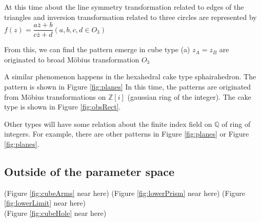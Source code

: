\documentclass[suppldata, dvipdfmx]{interact}
\theoremstyle{plain}%
\theoremstyle{definition}
\theoremstyle{remark}
\theoremstyle{problemstyle}
\begin{document}
At this time about the line symmetry transformation related to edges of
the triangles and inversion transformation related to three circles 
are represented by
$f(z) = \dfrac{a\overline{z} + b}{c\overline{z}+ d} (a, b, c, d \in O_3)$

From this, we can find the pattern emerge in cube type (a) $z_A = z_B$
are originated to broad M\"obius transformation $O_3$

A similar phenomenon happens in the hexahedral cake type sphairahedron.
The pattern is shown in Figure \ref{fig:planes}
In this time, the patterns are originated from M\"obius transformations
on $\mathbb{Z}[i]$ (gaussian ring of the integer).
The cake type is shown in Figure \ref{fig:obsRect}.

Other types will have some relation about the finite index field on
 $\mathbb{Q}$ of ring of integers.
For example, there are other patterns in Figure
 \ref{fig:planes} or
 Figure \ref{fig:planes}.

\subsection{Outside of the parameter space}

\noindent(Figure \ref{fig:cubeArms} near here)
(Figure \ref{fig:lowerPrism} near here)
(Figure \ref{fig:lowerLimit} near here)\\
(Figure \ref{fig:cubeHole}
 near here)
\end{document}
